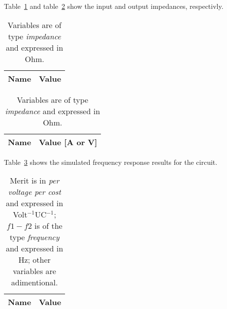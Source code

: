 Table~\ref{tab:SIM_ZIN} and table~\ref{tab:SIM_ZOUT} show the input and output impedances, respectivly.

\begin{table}[h]
	\centering
  	\begin{tabular}[t]{|l|r|}
    	\hline    
   		{\bf Name} & {\bf Value} \\ \hline
    	
  	\end{tabular}
  	\caption{ Variables are of type {\it impedance} and expressed in Ohm.}
  	\label{tab:SIM_ZIN}
\end{table}

\begin{table}[h]
	\centering
	\begin{tabular}[t]{|l|r|}
    	\hline    
   		{\bf Name} & {\bf Value [A or V]} \\ \hline
    	
  	\end{tabular}
	\caption{ Variables are of type {\it impedance} and expressed in Ohm.}
  	\label{tab:SIM_ZOUT}
\end{table}

Table~\ref{tab:SIM_RES} shows the simulated frequency response results for the circuit.

\begin{table}[h]
  \centering
  \begin{tabular}{|l|r|}
    \hline    
    {\bf Name} & {\bf Value} \\ \hline
    
  \end{tabular}
  \caption{Merit is in {\it per voltage per cost} and expressed in Volt$^{-1}$UC$^{-1}$; $f1 - f2$ is of the type {\it frequency} and expressed in Hz; other variables are adimentional.}
  \label{tab:SIM_RES}
\end{table}
